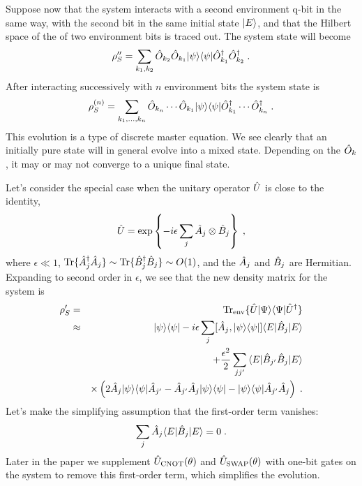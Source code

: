 Suppose now that the system interacts with a second environment q-bit in
the same way, with the second bit in the same initial state ${| E \rangle}$,
and that the Hilbert space of the of two environment bits is
traced out.  The system state will become
\begin{equation}
\rho''_S =
  \sum_{k_1,k_2} {\hat O}_{k_2} {\hat O}_{k_1} {| \psi \rangle}{\langle \psi |} {\hat O^\dagger}_{k_1} {\hat O^\dagger}_{k_2} \;.
\end{equation}
After interacting successively with $n$ environment bits the system state is
\begin{equation}
\rho^{(n)}_S =
  \sum_{k_1,\ldots,k_n} {\hat O}_{k_n} \cdots {\hat O}_{k_1}
  {| \psi \rangle}{\langle \psi |} {\hat O^\dagger}_{k_1} \cdots {\hat O^\dagger}_{k_n} \;.
\label{discrete_master}
\end{equation}
This evolution is a type of discrete master equation.  We see clearly that
an initially pure state will in general evolve into a mixed state.  Depending
on the ${\hat O}_k$, it may or may not converge to a unique final state.

Let's consider the special case when the unitary operator ${\hat U}$ is close
to the identity,
\begin{equation}
{\hat U} = \exp\left\{ - i \epsilon \sum_j {\hat A}_j\otimes{\hat B}_j \right\} \;,
\end{equation}
where $\epsilon\ll 1$, ${\rm Tr}\{{\hat A^\dagger}_j{\hat A}_j\} \sim {\rm Tr}\{{\hat B^\dagger}_j{\hat B}_j\} \sim O(1)$,
and the ${\hat A}_j$ and ${\hat B}_j$ are Hermitian.  Expanding
to second order in $\epsilon$, we see that the new density matrix for the
system is
\begin{eqnarray}
\rho'_S &=& {\rm Tr}_{\rm env} \{ {\hat U} {| \Psi \rangle}{\langle \Psi |} {\hat U^\dagger} \} \nonumber\\
&\approx& {| \psi \rangle}{\langle \psi |} - 
  i \epsilon \sum_j [{\hat A}_j, {| \psi \rangle}{\langle \psi |}] {\langle E |}{\hat B}_j{| E \rangle} \nonumber\\
&& + {\epsilon^2\over2} \sum_{jj'} {\langle E |}{\hat B}_{j'}{\hat B}_j{| E \rangle} \nonumber\\
&& \times
  \left( 2 {\hat A}_j {| \psi \rangle}{\langle \psi |} {\hat A}_{j'} - {\hat A}_{j'}{\hat A}_j {| \psi \rangle}{\langle \psi |}
  - {| \psi \rangle}{\langle \psi |} {\hat A}_{j'}{\hat A}_j  \right) \;.
\label{infinitesimal_rho}
\end{eqnarray}
Let's make the simplifying assumption that the first-order term vanishes:
\begin{equation}
\sum_j {\hat A}_j {\langle E |}{\hat B}_j{| E \rangle} = 0 \;.
\end{equation}
Later in the paper we supplement ${\hat U}_{\rm CNOT}(\theta)$ and
${\hat U}_{\rm SWAP}(\theta)$ with one-bit gates on the system to remove this
first-order term, which simplifies the evolution.


